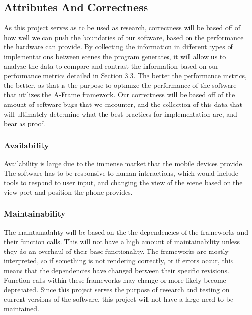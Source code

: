 \documentclass[letterpaper,10pt,titlepage,draftclsnofoot,onecolumn,compsoc,utf8,latin1]{IEEEtran}
\begin{document}
\begin{singlespace}
\subsection{Attributes And Correctness}
\begin{singlespace}
\noindent
As this project serves as to be used as research, correctness will be based off of how well we can push the boundaries of our software, based on the performance the hardware can provide. By collecting the information in different types of implementations between scenes the program generates, it will allow us to analyze the data to compare and contrast the information based on our performance metrics detailed in Section 3.3. The better the performance metrics, the better, as that is the purpose to optimize the performance of the software that utilizes the A-Frame framework. Our correctness will be based off of the amount of software bugs that we encounter, and the collection of this data that will ultimately determine what the best practices for implementation are, and bear as proof.
\end{singlespace}

\subsubsection{Availability}
\begin{singlespace}
\noindent
Availability is large due to the immense market that the mobile devices provide. The software has to be responsive to human interactions, which would include tools to respond to user input, and changing the view of the scene based on the view-port and position the phone provides.
\end{singlespace}

\subsubsection{Maintainability}
\begin{singlespace}
\noindent
The maintainability will be based on the the dependencies of the frameworks and their function calls. This will not have a high amount of maintainability unless they do an overhaul of their base functionality. The frameworks are mostly interpreted, so if something is not rendering correctly, or if errors occur, this means that the dependencies have changed between their specific revisions. Function calls within these frameworks may change or more likely become deprecated. Since this project serves the purpose of research and testing on current versions of the software, this project will not have a large need to be maintained.
\end{singlespace}


\end{singlespace}
\end{document}
